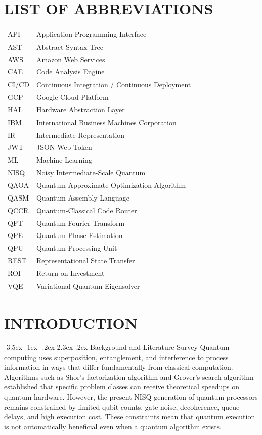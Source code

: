 \documentclass[12pt,a4paper]{report}
\makeatletter
\renewcommand\section{\@startsection{section}{1}{\z@}%
  {-3.5ex \@plus -1ex \@minus -.2ex}%
  {2.3ex \@plus.2ex}%
  {\normalfont\bfseries\fontsize{12pt}{16pt}\selectfont}}
\makeatother
\begin{document}
\chapter*{LIST OF ABBREVIATIONS}
\begin{longtable}{p{}p{}}
API & Application Programming Interface \\
AST & Abstract Syntax Tree \\
AWS & Amazon Web Services \\
CAE & Code Analysis Engine \\
CI/CD & Continuous Integration / Continuous Deployment \\
GCP & Google Cloud Platform \\
HAL & Hardware Abstraction Layer \\
IBM & International Business Machines Corporation \\
IR & Intermediate Representation \\
JWT & JSON Web Token \\
ML & Machine Learning \\
NISQ & Noisy Intermediate-Scale Quantum \\
QAOA & Quantum Approximate Optimization Algorithm \\
QASM & Quantum Assembly Language \\
QCCR & Quantum-Classical Code Router \\
QFT & Quantum Fourier Transform \\
QPE & Quantum Phase Estimation \\
QPU & Quantum Processing Unit \\
REST & Representational State Transfer \\
ROI & Return on Investment \\
VQE & Variational Quantum Eigensolver \\
\end{longtable}

\clearpage
{}

\chapter{INTRODUCTION}

\section{Background and Literature Survey}
Quantum computing uses superposition, entanglement, and interference to process information in ways that differ fundamentally from classical computation. Algorithms such as Shor's factorization algorithm and Grover's search algorithm established that specific problem classes can receive theoretical speedups on quantum hardware. However, the present NISQ generation of quantum processors remains constrained by limited qubit counts, gate noise, decoherence, queue delays, and high execution cost. These constraints mean that quantum execution is not automatically beneficial even when a quantum algorithm exists.
\end{document}
